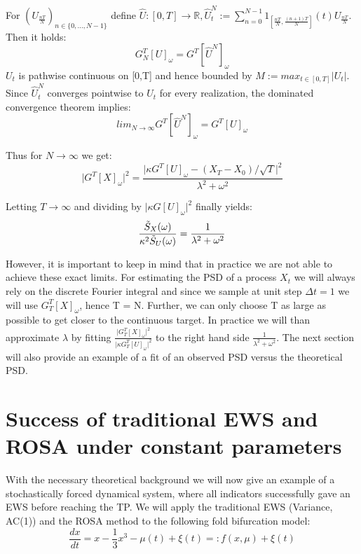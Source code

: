 \documentclass[%
thesis=student,%
coverpage=false,%
titlepage=false,%
headmarks=true, %
english,%
font=libertine, %
math=newpxtx, %
BCOR=5mm,%
coverBCOR=11mm%
]{tumbook}
\begin{document}
For $(U_{\frac{nT}{N}})_{n \in \{0,...,N-1\}}$ define $\hat{U}:[0,T]\rightarrow\mathbb{R}, \hat{U}_{t}^{N} := \sum_{n=0}^{N-1}1_{[\frac{nT}{N},\frac{(n+1)T}{N}]}(t)U_{\frac{nT}{N}}$. Then it holds:
\[
G_{N}^{T}[U]_{\omega} = G^{T}[\hat{U}^{N}]_{\omega}
\]
$U_{t}$ is pathwise continuous on [0,T] and hence bounded by $M := max_{t\in [0,T]} \lvert U_{t} \rvert$. Since $\hat{U}_{t}^{N}$ converges pointwise to $U_{t}$ for every realization, the dominated convergence theorem implies:
\[
lim_{N\rightarrow\infty}G^{T}[\hat{U}^{N}]_{\omega} = G^{T}[U]_{\omega}
\]

Thus for $N \rightarrow \infty$ we get:
\[
    \lvert G^{T}[X]_{\omega} \rvert^2 = \frac{\lvert\kappa G^{T}[U]_{\omega} - (X_{T}-X_{0})/\sqrt{T}\rvert ^2}{\lambda^2 + \omega^2}
\]

Letting $T \rightarrow \infty$ and dividing by $\lvert\kappa G[U]_{\omega}\rvert^2$ finally yields:
\[
    \frac{\Tilde{S}_{X}(\omega)}{\kappa^2\Tilde{S}_{U}(\omega)} = \frac{1}{\lambda^2 + \omega^2}
\]

However, it is important to keep in mind that in practice we are not able to achieve these exact limits. For estimating the PSD of a process $X_{t}$ we will always rely on the discrete Fourier integral and since we sample at unit step $\Delta t = 1$ we will use $G_{T}^{T}[X]_{\omega}$, hence T = N. Further, we can only choose T as large as possible to get closer to the continuous target. In practice we will than approximate $\lambda$ by fitting $\frac{\lvert G_{T}^{T}[X]_{\omega} \rvert ^2}{\lvert \kappa G_{T}^{T}[U]_{\omega} \rvert ^2}$ to the right hand side $\frac{1}{\lambda^2 + \omega^2}$. The next section will also provide an example of a fit of an observed PSD versus the theoretical PSD.





\chapter{Success of traditional EWS and ROSA under constant parameters}

With the necessary theoretical background we will now give an example of a stochastically forced dynamical system, where all indicators successfully gave an EWS before reaching the TP.
We will apply the traditional EWS (Variance, AC(1)) and the ROSA method to the following fold bifurcation model: 
        \[
            \frac{dx}{dt} = x - \frac{1}{3}x^3 - \mu(t) + \xi(t) =: f(x,\mu) + \xi(t)
        \]
        
\end{document}
